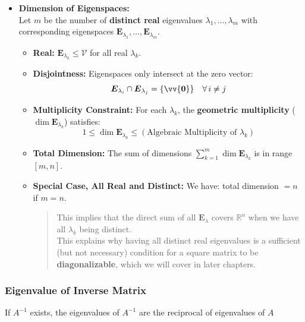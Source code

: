 \documentclass[11pt]{article}
\DeclareRobustCommand{\myvec}[1]{\vv{\mathbf{#1}}}
\newcommand{\myvecsp}[1]{\bm{\mathcal{#1}}}
\newcommand{\mysubvecsp}[1]{\bm{{#1}}}
\newcommand{\mymat}[1]{#1}
\begin{document}
\begin{itemize}
        \item \textbf{Dimension of Eigenspaces:} \vspace{1ex} \\
            Let $m$ be the number of \textbf{distinct real} eigenvalues $\lambda_1, \dots, \lambda_m$ with corresponding eigenspaces $\mysubvecsp{E}_{\lambda_1}, \dots, \mysubvecsp{E}_{\lambda_m}$.
            \begin{itemize}
                \item \textbf{Real:} $\mysubvecsp{E}_{\lambda_k} \le \myvecsp{V}$ for all real $\lambda_k$.
                \item \textbf{Disjointness:} Eigenspaces only intersect at the zero vector:
                \begin{equation}
                    \mysubvecsp{E}_{\lambda_i} \cap \mysubvecsp{E}_{\lambda_j} = \{\myvec{0}\} \quad \forall\,i \ne j
                \end{equation}
                \item \textbf{Multiplicity Constraint:} For each $\lambda_k$, the \textbf{geometric multiplicity} ($\dim \mysubvecsp{E}_{\lambda_k}$) satisfies:
                \begin{equation}
                    1 \le \dim \mysubvecsp{E}_{\lambda_k} \le (\text{Algebraic Multiplicity of } \lambda_k)
                \end{equation}
                \item \textbf{Total Dimension:} The sum of dimensions $\sum_{k=1}^m \dim \mysubvecsp{E}_{\lambda_k}$ is in range $[m, n]$.
                \item \textbf{Special Case, All Real and Distinct:} We have: total dimension $ = n$ if $m = n$. \\ 
                    \begin{quote}
                        This implies that the direct sum of all $\mysubvecsp{E}_{\lambda}$ covers $\mathbb{R}^n$ when we have all $\lambda_k$ being distinct. \\
                        This explains why having all distinct real eigenvalues is a sufficient (but not necessary) condition for a square matrix to be \textbf{diagonalizable}, which we will cover in later chapters.
                    \end{quote}
            \end{itemize}
    \end{itemize}
    
    \newpage
    \subsubsection{Eigenvalue of Inverse Matrix}
    If $\mymat{A}^{-1}$ exists, the eigenvalues of $\mymat{A}^{-1}$ are the reciprocal of eigenvalues of $\mymat{A}$\\
    
\end{document}
